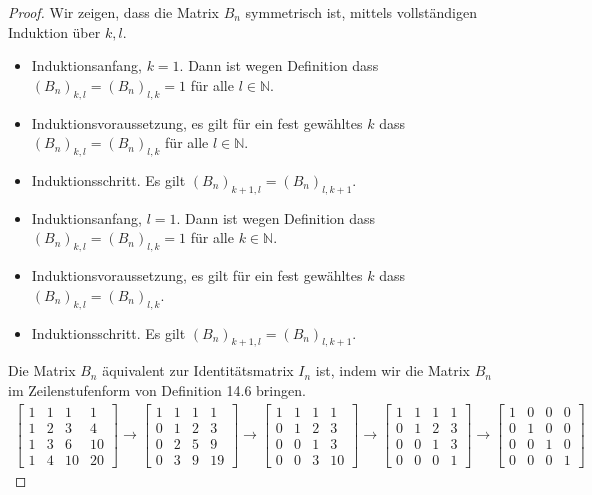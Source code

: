 \documentclass[draft,a5paper]{article}
\begin{document}
\begin{proof}
  Wir zeigen, dass die Matrix \(B_{n}\) symmetrisch ist, mittels
  vollständigen Induktion über \(k, l\).
  \begin{itemize}
  \item Induktionsanfang, \(k = 1\).  Dann ist wegen Definition dass \((B_{n})_{k, l} = (B_{n})_{l,
      k} = 1\) für alle \(l \in \mathbb{N}\).
  \item   Induktionsvoraussetzung, es gilt für ein fest gewähltes \(k\) dass
    \((B_{n})_{k, l} = (B_{n})_{l, k}\) für alle \(l \in \mathbb{N}\).
  \item   Induktionsschritt. Es gilt     \((B_{n})_{k + 1, l} = (B_{n})_{l, k + 1}\).
  \item Induktionsanfang, \(l = 1\).  Dann ist wegen Definition dass \((B_{n})_{k, l} = (B_{n})_{l,
      k} = 1\) für alle \(k \in \mathbb{N}\).
  \item   Induktionsvoraussetzung, es gilt für ein fest gewähltes \(k\) dass
    \((B_{n})_{k, l} = (B_{n})_{l, k}\).
  \item   Induktionsschritt. Es gilt     \((B_{n})_{k + 1, l} = (B_{n})_{l, k + 1}\).
  \end{itemize}



  Die Matrix \(B_{n}\) äquivalent zur Identitätsmatrix
  \(I_{n}\) ist, indem wir die Matrix \(B_{n}\) im Zeilenstufenform von
  Definition 14.6 bringen.
  \begin{align*}
    \begin{bmatrix}
      1 & 1 & 1 & 1 \\
      1 & 2 & 3 & 4 \\
      1 & 3 & 6 & 10 \\
      1 & 4 & 10 & 20
    \end{bmatrix}
    \to
    \begin{bmatrix}
      1 & 1 & 1 & 1 \\
      0 & 1 & 2 & 3 \\
      0 & 2 & 5 & 9 \\
      0 & 3 & 9 & 19
    \end{bmatrix}
    \to
    \begin{bmatrix}
      1 & 1 & 1 & 1 \\
      0 & 1 & 2 & 3 \\
      0 & 0 & 1 & 3 \\
      0 & 0 & 3 & 10
    \end{bmatrix}
    \to
    \begin{bmatrix}
      1 & 1 & 1 & 1 \\
      0 & 1 & 2 & 3 \\
      0 & 0 & 1 & 3 \\
      0 & 0 & 0 & 1
    \end{bmatrix}
    \to
    \begin{bmatrix}
      1 & 0 & 0 & 0 \\
      0 & 1 & 0 & 0 \\
      0 & 0 & 1 & 0 \\
      0 & 0 & 0 & 1
    \end{bmatrix}
  \end{align*}
\end{proof}
\end{document}
